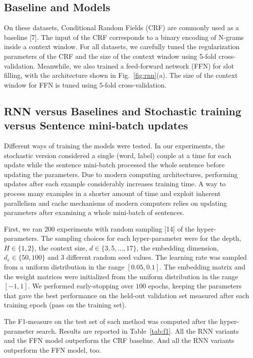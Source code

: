 \subsection{Baseline and Models}

On these datasets, Conditional Random Fields (CRF) are commonly used as a
baseline [7]. The input of the CRF corresponds to a binary encoding of N-grams
inside a context window. For all datasets, we carefully tuned the
regularization parameters of the CRF and the size of the context window using
5-fold cross-validation. Meanwhile, we also trained a feed-forward network
(FFN) for slot filling, with the architecture shown in Fig.~\ref{fig:rnn}(a).
The size of the context window for FFN is tuned using 5-fold cross-validation.

\subsection{RNN versus Baselines and Stochastic training versus Sentence mini-batch updates}

Different ways of training the models were tested. In our experiments, the
stochastic version considered a single (word, label) couple at a time for each
update while the sentence mini-batch processed the whole sentence before
updating the parameters. Due to modern computing architectures, performing
updates after each example considerably increases training time. A way to
process many examples in a shorter amount of time and exploit inherent
parallelism and cache mechanisms of modern computers relies on updating
parameters after examining a whole mini-batch of sentences.

First, we ran $200$ experiments with random sampling [14] of the
hyper-parameters. The sampling choices for each hyper-parameter were for the
depth, $H\in\{1,2\}$, the context size, $d\in\{3,5,\dots,17\}$, the embedding
dimension, $d_{e}\in\{50,100\}$ and $3$ different random seed values. The
learning rate was sampled from a uniform distribution in the range
$[0.05,0.1]$. The embedding matrix and the weight matrices were initialized
from the uniform distribution in the range $[-1,1]$. We performed
early-stopping over $100$ epochs, keeping the parameters that gave the best
performance on the held-out validation set measured after each training epoch
(pass on the training set). 

The F1-measure on the test set of each method was computed after the
hyper-parameter search. Results are reported in Table~\ref{tab:f1}. All the RNN variants
and the FFN model outperform the CRF baseline. And all the RNN variants
outperform the FFN model, too. 

